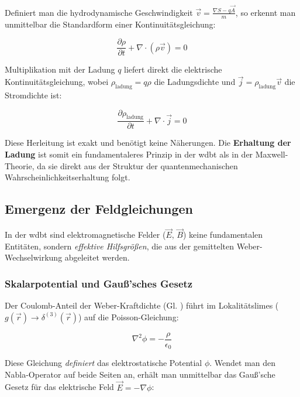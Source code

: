 Definiert man die hydrodynamische Geschwindigkeit $\vec{v} = \frac{\nabla S - q\vec{A}}{m}$, so erkennt man unmittelbar die Standardform einer Kontinuitätsgleichung:

\begin{equation}
    \frac{\partial \rho}{\partial t} + \nabla \cdot (\rho \vec{v}) = 0
\end{equation}

Multiplikation mit der Ladung $q$ liefert direkt die elektrische Kontinuitätsgleichung, wobei $\rho_{\text{ladung}} = q\rho$ die Ladungsdichte und $\vec{j} = \rho_{\text{ladung}} \vec{v}$ die Stromdichte ist:

\begin{equation}
    \frac{\partial \rho_{\text{ladung}}}{\partial t} + \nabla \cdot \vec{j} = 0
\end{equation}

Diese Herleitung ist exakt und benötigt keine Näherungen. Die \textbf{Erhaltung der Ladung} ist somit ein fundamentaleres Prinzip in der \gls{wdbt} als in der Maxwell-Theorie, da sie direkt aus der
Struktur der quantenmechanischen Wahrscheinlichkeitserhaltung folgt.

\subsection{Emergenz der Feldgleichungen}

In der \gls{wdbt} sind elektromagnetische Felder ($\vec{E}$, $\vec{B}$) keine fundamentalen Entitäten, sondern \textit{effektive Hilfsgrößen}, die aus der gemittelten Weber-Wechselwirkung abgeleitet
werden.

\subsubsection{Skalarpotential und Gauß'sches Gesetz}

Der Coulomb-Anteil der Weber-Kraftdichte (Gl. ) führt im Lokalitätslimes ($g(\vec{r}) \rightarrow \delta^{(3)}(\vec{r})$)
 auf die Poisson-Gleichung:

\begin{equation}
    \nabla^2 \phi = -\frac{\rho}{\epsilon_0}
\end{equation}

Diese Gleichung \textit{definiert} das elektrostatische Potential $\phi$. Wendet man den Nabla-Operator auf beide Seiten an, erhält man unmittelbar das Gauß'sche Gesetz für das elektrische Feld $\vec{E} = -\nabla \phi$:

